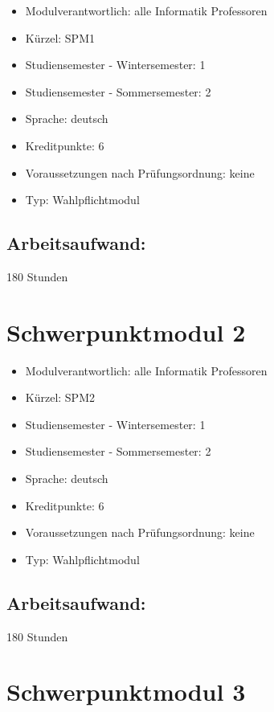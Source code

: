 \begin{itemize}
\tightlist
\item
  Modulverantwortlich: alle Informatik Professoren
\item
  Kürzel: SPM1
\item
  Studiensemester - Wintersemester: 1
\item
  Studiensemester - Sommersemester: 2
\item
  Sprache: deutsch
\item
  Kreditpunkte: 6
\item
  Voraussetzungen nach Prüfungsordnung: keine
\item
  Typ: Wahlpflichtmodul
\end{itemize}

\section*{Arbeitsaufwand:}\label{arbeitsaufwand-3}

180 Stunden

\chapter{Schwerpunktmodul 2}\label{schwerpunktmodul-2}

\begin{itemize}
\tightlist
\item
  Modulverantwortlich: alle Informatik Professoren
\item
  Kürzel: SPM2
\item
  Studiensemester - Wintersemester: 1
\item
  Studiensemester - Sommersemester: 2
\item
  Sprache: deutsch
\item
  Kreditpunkte: 6
\item
  Voraussetzungen nach Prüfungsordnung: keine
\item
  Typ: Wahlpflichtmodul
\end{itemize}

\section*{Arbeitsaufwand:}\label{arbeitsaufwand-4}

180 Stunden

\chapter{Schwerpunktmodul 3}\label{schwerpunktmodul-3}

